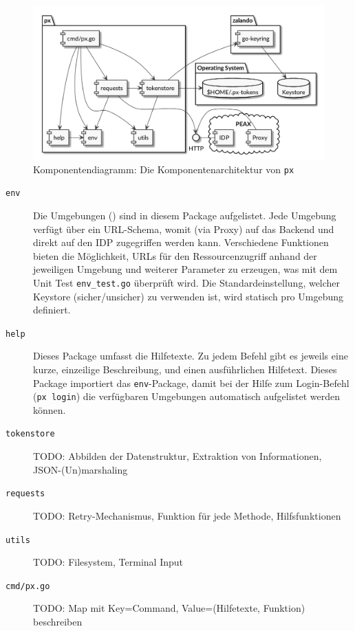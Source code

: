 \begin{figure}
    \centering
    \includegraphics[width=\linewidth]{pics/komponentendiagramm.png}
    \caption{Komponentendiagramm: Die Komponentenarchitektur von \texttt{px}}
    \label{img:Komponentendiagramm}
\end{figure}

\begin{description}
    \item[\texttt{env}] Die Umgebungen () sind in diesem Package aufgelistet. Jede Umgebung verfügt über ein URL-Schema, womit (via Proxy) auf das Backend und direkt auf den IDP zugegriffen werden kann. Verschiedene Funktionen bieten die Möglichkeit, URLs für den Ressourcenzugriff anhand der jeweiligen Umgebung und weiterer Parameter zu erzeugen, was mit dem Unit Test \texttt{env\_test.go} überprüft wird. Die Standardeinstellung, welcher Keystore (sicher/unsicher) zu verwenden ist, wird statisch pro Umgebung definiert.
    \item[\texttt{help}] Dieses Package umfasst die Hilfetexte. Zu jedem Befehl gibt es jeweils eine kurze, einzeilige Beschreibung, und einen ausführlichen Hilfetext. Dieses Package importiert das \texttt{env}-Package, damit bei der Hilfe zum Login-Befehl (\texttt{px login}) die verfügbaren Umgebungen automatisch aufgelistet werden können.
    \item[\texttt{tokenstore}] TODO: Abbilden der Datenstruktur, Extraktion von Informationen, JSON-(Un)marshaling
    \item[\texttt{requests}] TODO: Retry-Mechanismus, Funktion für jede Methode, Hilfsfunktionen
    \item[\texttt{utils}] TODO: Filesystem, Terminal Input
    \item[\texttt{cmd/px.go}] TODO: Map mit Key=Command, Value=(Hilfetexte, Funktion) beschreiben
\end{description}

